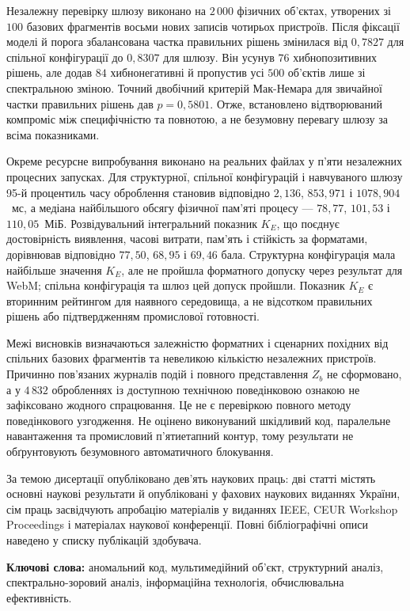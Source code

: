 Незалежну перевірку шлюзу виконано на $2\,000$ фізичних об’єктах, утворених зі $100$ базових фрагментів восьми нових записів чотирьох пристроїв. Після фіксації моделі й порога збалансована частка правильних рішень змінилася від $0{,}7827$ для спільної конфігурації до $0{,}8307$ для шлюзу. Він усунув $76$ хибнопозитивних рішень, але додав $84$ хибнонегативні й пропустив усі $500$ об’єктів лише зі спектральною зміною. Точний двобічний критерій Мак-Немара для звичайної частки правильних рішень дав $p=0{,}5801$. Отже, встановлено відтворюваний компроміс між специфічністю та повнотою, а не безумовну перевагу шлюзу за всіма показниками.

Окреме ресурсне випробування виконано на реальних файлах у п’яти незалежних процесних запусках. Для структурної, спільної конфігурацій і навчуваного шлюзу 95-й процентиль часу оброблення становив відповідно $2{,}136$, $853{,}971$ і $1078{,}904$~мс, а медіана найбільшого обсягу фізичної пам’яті процесу --- $78{,}77$, $101{,}53$ і $110{,}05$~МіБ. Розвідувальний інтегральний показник $K_E$, що поєднує достовірність виявлення, часові витрати, пам’ять і стійкість за форматами, дорівнював відповідно $77{,}50$, $68{,}95$ і $69{,}46$ бала. Структурна конфігурація мала найбільше значення $K_E$, але не пройшла форматного допуску через результат для WebM; спільна конфігурація та шлюз цей допуск пройшли. Показник $K_E$ є вторинним рейтингом для наявного середовища, а не відсотком правильних рішень або підтвердженням промислової готовності.

Межі висновків визначаються залежністю форматних і сценарних похідних від спільних базових фрагментів та невеликою кількістю незалежних пристроїв. Причинно пов’язаних журналів подій і повного представлення $Z_b$ не сформовано, а у $4\,832$ обробленнях із доступною технічною поведінковою ознакою не зафіксовано жодного спрацювання. Це не є перевіркою повного методу поведінкового узгодження. Не оцінено виконуваний шкідливий код, паралельне навантаження та промисловий п’ятиетапний контур, тому результати не обґрунтовують безумовного автоматичного блокування.

За темою дисертації опубліковано дев’ять наукових праць: дві статті містять основні наукові результати й опубліковані у фахових наукових виданнях України, сім праць засвідчують апробацію матеріалів у виданнях IEEE, CEUR Workshop Proceedings і матеріалах наукової конференції. Повні бібліографічні описи наведено у списку публікацій здобувача.

\textbf{Ключові слова:} аномальний код, мультимедійний об’єкт, структурний аналіз, спектрально-зоровий аналіз, інформаційна технологія, обчислювальна ефективність.

\clearpage
